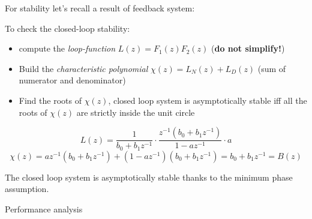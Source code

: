 
\begin{rem}
    For stability let's recall a result of feedback system:
    \begin{figure}[H]
        \centering
    \end{figure}

    To check the closed-loop stability:
    \begin{itemize}
        \item compute the \emph{loop-function} $L(z) = F_1(z) F_2(z)$ (\textbf{do not simplify!})
        \item Build the \emph{characteristic polynomial} $\chi(z) = L_N(z) + L_D(z)$ (sum of numerator and denominator)
        \item Find the roots of $\chi(z)$, closed loop system is asymptotically stable iff all the roots of $\chi(z)$ are strictly inside the unit circle
    \end{itemize}
\end{rem}

\[
    L(z) = \frac{1}{b_0+b_1z^{-1}} \cdot \frac{z^{-1}(b_0+b_1z^{-1})}{1-az^{-1}} \cdot a
\]
\[
    \chi(z) = az^{-1}(b_0+b_1z^{-1}) + (1-az^{-1})(b_0+b_1z^{-1}) = b_0+b_1z^{-1} = B(z)
\]

The closed loop system is asymptotically stable thanks to the minimum phase assumption.

Performance analysis
\begin{figure}[H]
    \centering
\end{figure}

